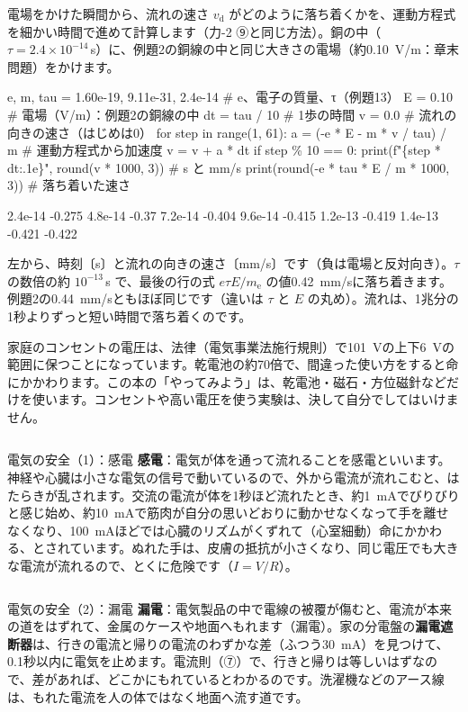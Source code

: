 電場をかけた瞬間から、流れの速さ $v_{\mathrm d}$ がどのように落ち着くかを、運動方程式を細かい時間で進めて計算します（力-2 ⑨と同じ方法）。銅の中（$\tau=2.4\times10^{-14}$\,s）に、例題2の銅線の中と同じ大きさの電場（約\qty{0.10}{V/m}：章末問題）をかけます。
\begin{phcode}[Python]
e, m, tau = 1.60e-19, 9.11e-31, 2.4e-14   \# e、電子の質量、τ（例題13）
E = 0.10                  \# 電場（V/m）：例題2の銅線の中
dt = tau / 10             \# 1歩の時間
v = 0.0                   \# 流れの向きの速さ（はじめは0）
for step in range(1, 61):
    a = (-e * E - m * v / tau) / m      \# 運動方程式から加速度
    v = v + a * dt
    if step \% 10 == 0:
        print(f"\{step * dt:.1e\}", round(v * 1000, 3))   \# s と mm/s
print(round(-e * tau * E / m * 1000, 3))                \# 落ち着いた速さ
\end{phcode}
\begin{phcodeout}
2.4e-14 -0.275
4.8e-14 -0.37
7.2e-14 -0.404
9.6e-14 -0.415
1.2e-13 -0.419
1.4e-13 -0.421
-0.422
\end{phcodeout}
左から、時刻〔s〕と流れの向きの速さ〔mm/s〕です（負は電場と反対向き）。$\tau$ の数倍の約 $10^{-13}$\,s で、最後の行の式 $e\tau E/m_{\mathrm e}$ の値\qty{0.42}{mm/s}に落ち着きます。例題2の\qty{0.44}{mm/s}ともほぼ同じです（違いは $\tau$ と $E$ の丸め）。流れは、1兆分の1秒よりずっと短い時間で落ち着くのです。

\label{ph:電-4:sec12}
家庭のコンセントの電圧は、法律（電気事業法施行規則）で\qty{101}{V}の上下\qty{6}{V}の範囲に保つことになっています。乾電池の約70倍で、間違った使い方をすると命にかかわります。この本の「やってみよう」は、乾電池・磁石・方位磁針などだけを使います。コンセントや高い電圧を使う実験は、決して自分でしてはいけません。

\begin{column}{電気の安全（1）：感電}
\textbf{感電}：電気が体を通って流れることを感電といいます。神経や心臓は小さな電気の信号で動いているので、外から電流が流れこむと、はたらきが乱されます。交流の電流が体を1秒ほど流れたとき、約\qty{1}{mA}でびりびりと感じ始め、約\qty{10}{mA}で筋肉が自分の思いどおりに動かせなくなって手を離せなくなり、\qty{100}{mA}ほどでは心臓のリズムがくずれて（心室細動）命にかかわる、とされています。ぬれた手は、皮膚の抵抗が小さくなり、同じ電圧でも大きな電流が流れるので、とくに危険です（$I=V/R$）。
\end{column}

\begin{column}{電気の安全（2）：漏電}
\textbf{漏電}：電気製品の中で電線の被覆が傷むと、電流が本来の道をはずれて、金属のケースや地面へもれます（漏電）。家の分電盤の\textbf{漏電遮断器}は、行きの電流と帰りの電流のわずかな差（ふつう\qty{30}{mA}）を見つけて、0.1秒以内に電気を止めます。電流則（⑦）で、行きと帰りは等しいはずなので、差があれば、どこかにもれているとわかるのです。洗濯機などのアース線は、もれた電流を人の体ではなく地面へ流す道です。

\end{column}

